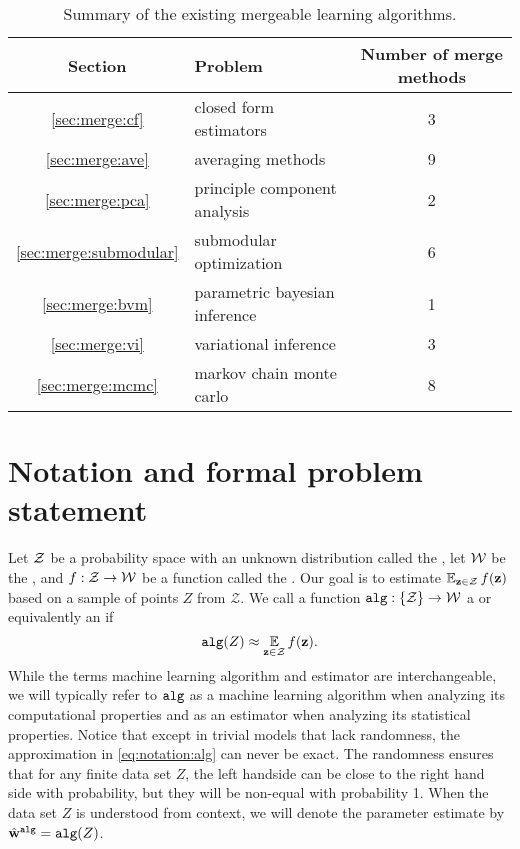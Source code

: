 \documentclass[thesis.tex]{subfiles}
\newcommand{\set}[1]{\mathcal {#1}}
\newcommand{\alg}{\mkprocedure{alg}}
\newcommand{\f}{f}
\newcommand{\walg}{{\hat\w^{\alg}}}
\begin{document}
\begin{table}[h]
    \centering
    \begin{tabular}{clc}
    Section & Problem & Number of merge methods \\
    \hline
       \ref{sec:merge:cf} & closed form estimators & 3
    \\ \ref{sec:merge:ave} & averaging methods & 9 
    \\ \ref{sec:merge:pca} & principle component analysis & 2
    \\ \ref{sec:merge:submodular} & submodular optimization & 6
    \\ \ref{sec:merge:bvm} & parametric bayesian inference  & 1
    \\ \ref{sec:merge:vi} & variational inference & 3 
    \\ \ref{sec:merge:mcmc} & markov chain monte carlo & 8 
    \end{tabular}
    \caption{ Summary of the existing mergeable learning algorithms.}
    \label{table:merge:summary}
\end{table}


\section{Notation and formal problem statement}
\label{sec:notation}
Let ${\mathcal Z}$ be a probability space with an unknown distribution called the ,
let ${\mathcal W}$ be the ,
and $\f : \Z \to \W$ be a function called the .
Our goal is to estimate $\E_{\z\in\Z} \f(\z)$ based on a sample of points $Z$ from $\set Z$.
We call a function $\alg : \{\Z\} \to \W$ a  or equivalently an  if
\begin{equation}
    \label{eq:notation:alg}
    \alg(Z) \approx \E_{\z\in\Z}\f(\z)
    .
\end{equation}
While the terms machine learning algorithm and estimator are interchangeable,
we will typically refer to $\alg$ as a machine learning algorithm when analyzing its computational properties
and as an estimator when analyzing its statistical properties.
Notice that except in trivial models that lack randomness, 
the approximation in \eqref{eq:notation:alg} can never be exact.
The randomness ensures that for any finite data set $Z$,
the left handside can be close to the right hand side with probability,
but they will be non-equal with probability 1.
When the data set $Z$ is understood from context,
we will denote the parameter estimate by $\walg=\alg(Z)$.
\end{document}
